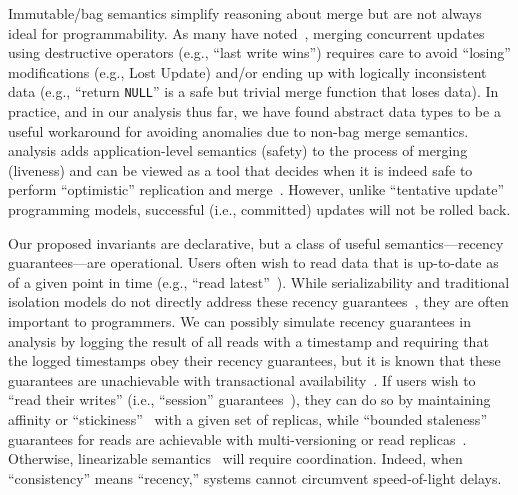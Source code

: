 Immutable/bag semantics simplify reasoning about merge but are not
always ideal for programmability. As many have
noted~\cite{bayou,gray-book}, merging concurrent updates using
destructive operators (e.g., ``last write wins'') requires care to
avoid ``losing'' modifications (e.g., Lost Update) and/or ending up
with logically inconsistent data (e.g., ``return \texttt{NULL}'' is a
safe but trivial merge function that loses data). In practice, and in
our analysis thus far, we have found abstract data types to be a
useful workaround for avoiding anomalies due to non-bag merge
semantics. \iconfluence analysis adds application-level semantics
(safety) to the process of merging (liveness) and can be viewed as a
tool that decides when it is indeed safe to perform ``optimistic''
replication and merge~\cite{optimistic}. However, unlike ``tentative
update'' programming models, successful (i.e., committed) updates will
not be rolled back.

Our proposed invariants are declarative, but a class of useful
semantics---recency guarantees---are operational. Users often wish to
read data that is up-to-date as of a given point in time (e.g., ``read
latest''~\cite{pnuts}). While serializability and traditional
isolation models do not directly address these recency
guarantees~\cite{adya-isolation}, they are often important to
programmers. We can possibly simulate recency guarantees in
\iconfluence analysis by logging the result of all reads with a
timestamp and requiring that the logged timestamps obey their recency
guarantees, but it is known that these guarantees are unachievable
with transactional availability~\cite{hat-vldb}. If users wish to
``read their writes'' (i.e., ``session'' guarantees~\cite{bayou}),
they can do so by maintaining affinity or
``stickiness''~\cite{hat-vldb,vogels-defs} with a given set of
replicas, while ``bounded staleness'' guarantees for reads are
achievable with multi-versioning or read
replicas~\cite{pnuts}. Otherwise, linearizable
semantics~\cite{spanner} will require coordination. Indeed, when
``consistency'' means ``recency,'' systems cannot circumvent speed-of-light
delays.


